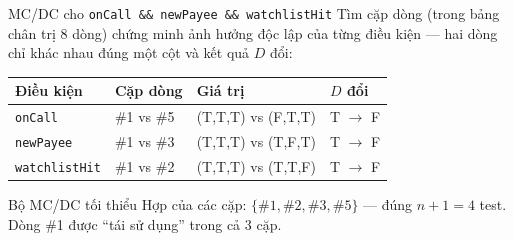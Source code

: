 \documentclass[aspectratio=169,12pt]{beamer}
\begin{document}
\begin{frame}{MC/DC cho \texttt{onCall \&\& newPayee \&\& watchlistHit}}
  Tìm cặp dòng (trong bảng chân trị 8 dòng) chứng minh ảnh hưởng
  độc lập của từng điều kiện --- hai dòng chỉ khác nhau đúng một cột
  và kết quả $D$ đổi:

  \vspace{0.3em}
  \begin{center}
  \small
  \begin{tabular}{llll}
    \toprule
    \textbf{Điều kiện} & \textbf{Cặp dòng} & \textbf{Giá trị} & \textbf{$D$ đổi} \\
    \midrule
    \texttt{onCall}       & \#1 vs \#5 & (T,T,T) vs (F,T,T) & T $\to$ F \\
    \texttt{newPayee}     & \#1 vs \#3 & (T,T,T) vs (T,F,T) & T $\to$ F \\
    \texttt{watchlistHit} & \#1 vs \#2 & (T,T,T) vs (T,T,F) & T $\to$ F \\
    \bottomrule
  \end{tabular}
  \end{center}

  \vspace{0.3em}
  \begin{exampleblock}{Bộ MC/DC tối thiểu}
    Hợp của các cặp: $\{\#1, \#2, \#3, \#5\}$ --- đúng $n+1 = 4$ test.
    Dòng \#1 được ``tái sử dụng'' trong cả 3 cặp.
  \end{exampleblock}
\end{frame}
\end{document}
